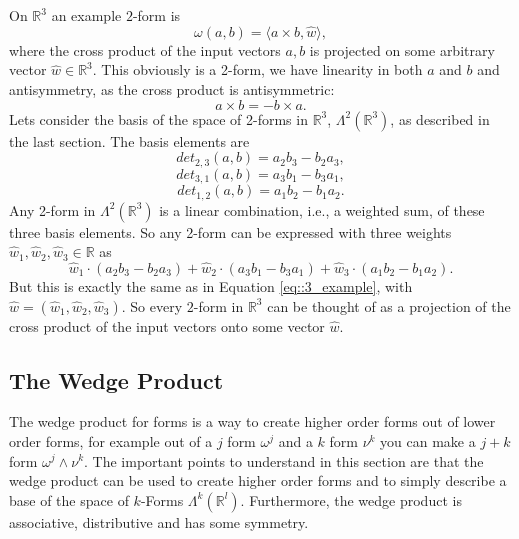 On $\mathbb R^3$ an example $2$-form is
\begin{equation}\omega(a,b) = \langle a \times b, \widehat{w} \rangle, \label{eq::3_example}\end{equation}
where the cross product of the input vectors $a,b$ is projected on some arbitrary vector $\widehat{w} \in \mathbb R^3$. This obviously is a 2-form, we have linearity in both $a$ and $b$ and antisymmetry, as the cross product is antisymmetric:
\[a\times b = - b \times a.\]
Lets consider the basis of the space of 2-forms in $\mathbb R^3$, $\Lambda^2(\mathbb R^3)$, as described in the last section. The basis elements are
\[det_{2,3} (a,b) = a_2 b_3 - b_2 a_3,\]
\[det_{3,1} (a,b) = a_3 b_1 - b_3 a_1,\]
\[det_{1,2} (a,b) = a_1 b_2 - b_1 a_2.\]
Any 2-form in $\Lambda^2(\mathbb R^3)$ is a linear combination, i.e., a weighted sum,  of these three basis elements. So any 2-form can be expressed with three weights $\widehat{w}_1,\widehat{w}_2,\widehat{w}_3 \in \mathbb R$ as
\[\widehat{w}_1 \cdot(a_2 b_3 - b_2 a_3) + \widehat{w}_2 \cdot(a_3 b_1 - b_3 a_1) + \widehat{w}_3 \cdot(a_1 b_2 - b_1 a_2). \]
But this is exactly the same as in Equation \ref{eq::3_example}, with $\widehat{w} = (\widehat{w}_1,\widehat{w}_2,\widehat{w}_3)$. So every $2$-form in $\mathbb R^3$ can be thought of as a projection of the cross product of the input vectors onto some vector $\widehat{w}$.  

\subsection{The Wedge Product}
\label{subsec:wedge}
The wedge product for forms is a way to create higher order forms out of lower order forms, for example out of a $j$ form $\omega^j$ and a $k$ form $\nu^k$ you can make a $j+k$ form $\omega^j\wedge \nu^k$. The important points to understand in this section are that the wedge product can be used to create higher order forms and to simply describe a base of the space of $k$-Forms $\Lambda^k(\mathbb R^l)$. Furthermore, the wedge product is associative, distributive and has some symmetry. 

